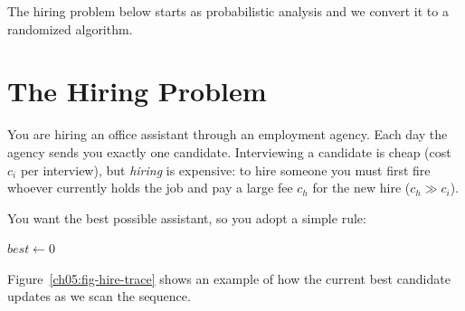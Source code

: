 The hiring problem below starts as probabilistic analysis and we convert it to a randomized algorithm.

\section{The Hiring Problem}
\label{ch05:hiring}

You are hiring an office assistant
through an employment agency. Each day the agency sends you exactly one
candidate. Interviewing a candidate is cheap (cost $c_i$ per interview), but
\emph{hiring} is expensive: to hire someone you must first fire whoever currently
holds the job and pay a large fee $c_h$ for the new hire ($c_h \gg c_i$).

You want the best possible assistant, so you adopt a simple rule:

\begin{algorithm}[htbp]
\caption{\textsc{Hire-Assistant}$(n)$}
$best \gets 0$ 
\end{algorithm}

Figure~\ref{ch05:fig-hire-trace} shows an example of how the current best candidate updates as we scan the sequence.

